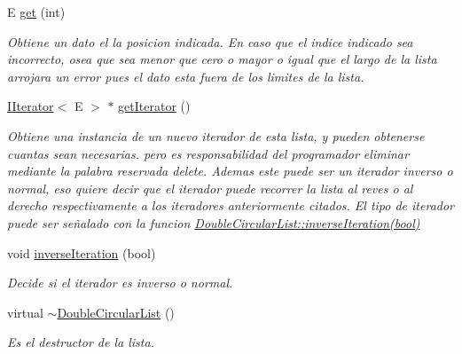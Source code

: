 \begin{DoxyCompactItemize}
E \hyperlink{classDoubleCircularList_aa00bc8fd524af1ba208f85d8816dec52}{get} (int)
\begin{DoxyCompactList}\small\item\em Obtiene un dato el la posicion indicada. En caso que el indice indicado sea incorrecto, osea que sea menor que cero o mayor o igual que el largo de la lista arrojara un error pues el dato esta fuera de los limites de la lista. \end{DoxyCompactList}\item 
\hyperlink{classIIterator}{I\-Iterator}$<$ E $>$ $\ast$ \hyperlink{classDoubleCircularList_abba1430e956c7660a88f786bfd8d87ad}{get\-Iterator} ()
\begin{DoxyCompactList}\small\item\em Obtiene una instancia de un nuevo iterador de esta lista, y pueden obtenerse cuantas sean necesarias. pero es responsabilidad del programador eliminar mediante la palabra reservada delete. Ademas este puede ser un iterador inverso o normal, eso quiere decir que el iterador puede recorrer la lista al reves o al derecho respectivamente a los iteradores anteriormente citados. El tipo de iterador puede ser señalado con la funcion \hyperlink{classDoubleCircularList_a77212c5d6ad148c99a06009a8c44128b}{Double\-Circular\-List\-::inverse\-Iteration(bool)}\end{DoxyCompactList}\item 
void \hyperlink{classDoubleCircularList_a77212c5d6ad148c99a06009a8c44128b}{inverse\-Iteration} (bool)
\begin{DoxyCompactList}\small\item\em Decide si el iterador es inverso o normal. \end{DoxyCompactList}\item 
\hypertarget{classDoubleCircularList_a26dba8b85983742cfbf38886245fe2a4}{virtual \hyperlink{classDoubleCircularList_a26dba8b85983742cfbf38886245fe2a4}{$\sim$\-Double\-Circular\-List} ()}\label{classDoubleCircularList_a26dba8b85983742cfbf38886245fe2a4}

\begin{DoxyCompactList}\small\item\em Es el destructor de la lista. \end{DoxyCompactList}\end{DoxyCompactItemize}

